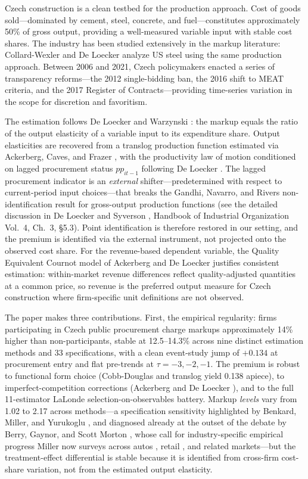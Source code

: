 \documentclass[11pt]{article}
\begin{document}
Czech construction is a clean testbed for the production approach. Cost of goods sold---dominated by cement, steel, concrete, and fuel---constitutes approximately 50\% of gross output, providing a well-measured variable input with stable cost shares. The industry has been studied extensively in the markup literature: Collard-Wexler and De Loecker \cite{CWDLKvsOmega} analyze US steel using the same production approach. Between 2006 and 2021, Czech policymakers enacted a series of transparency reforms---the 2012 single-bidding ban, the 2016 shift to MEAT criteria, and the 2017 Register of Contracts---providing time-series variation in the scope for discretion and favoritism.

The estimation follows De Loecker and Warzynski \cite{DLW2012}: the markup equals the ratio of the output elasticity of a variable input to its expenditure share. Output elasticities are recovered from a translog production function estimated via Ackerberg, Caves, and Frazer \cite{ACF2015}, with the productivity law of motion conditioned on lagged procurement status $pp_{it-1}$ following De Loecker \cite{DeLoecker2013}. The lagged procurement indicator is an \emph{external} shifter---predetermined with respect to current-period input choices---that breaks the Gandhi, Navarro, and Rivers \cite{GNR2020} non-identification result for gross-output production functions (see the detailed discussion in De Loecker and Syverson \cite{DLS2021}, Handbook of Industrial Organization Vol.~4, Ch.~3, \S5.3). Point identification is therefore restored in our setting, and the premium is identified via the external instrument, not projected onto the observed cost share. For the revenue-based dependent variable, the Quality Equivalent Cournot model of Ackerberg and De Loecker \cite{ADLQEC2026} justifies consistent estimation: within-market revenue differences reflect quality-adjusted quantities at a common price, so revenue is the preferred output measure for Czech construction where firm-specific unit definitions are not observed.

The paper makes three contributions. First, the empirical regularity: firms participating in Czech public procurement charge markups approximately 14\% higher than non-participants, stable at 12.5--14.3\% across nine distinct estimation methods and 33 specifications, with a clean event-study jump of $+0.134$ at procurement entry and flat pre-trends at $\tau = -3, -2, -1$. The premium is robust to functional form choice (Cobb-Douglas and translog yield 0.138 apiece), to imperfect-competition corrections (Ackerberg and De Loecker \cite{ADL2024}), and to the full 11-estimator LaLonde selection-on-observables battery. Markup \emph{levels} vary from 1.02 to 2.17 across methods---a specification sensitivity highlighted by Benkard, Miller, and Yurukoglu \cite{BMY2026}, and diagnosed already at the outset of the debate by Berry, Gaynor, and Scott Morton \cite{BerryGaynorMorton2019}, whose call for industry-specific empirical progress Miller \cite{MillerIJIO2025} now surveys across autos \cite{GriecoMurryYurukoglu2024}, retail \cite{DoepperMacKayMillerStiebale2025}, and related markets---but the treatment-effect differential is stable because it is identified from cross-firm cost-share variation, not from the estimated output elasticity.
\end{document}
